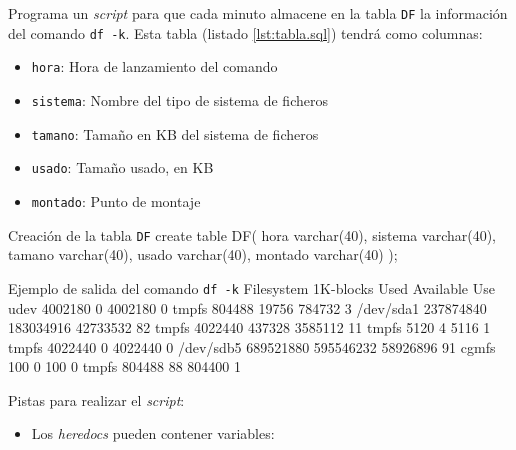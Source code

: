 \begin{homeworkProblem}


  Programa un \textit{script} para que cada minuto almacene en la tabla \texttt{DF} la información del comando \texttt{df -k}. Esta tabla (listado \ref{lst:tabla.sql}) tendrá como columnas:
  \begin{itemize}
  \item \texttt{hora}: Hora de lanzamiento del comando
  \item \texttt{sistema}: Nombre del tipo de sistema de ficheros
  \item \texttt{tamano}: Tamaño en KB del sistema de ficheros
  \item \texttt{usado}: Tamaño usado, en KB
  \item \texttt{montado}: Punto de montaje
  \end{itemize}

  \begin{listadoshell}{Creación de la tabla \texttt{DF}}
  create table DF(
    hora varchar(40),
    sistema varchar(40),
    tamano varchar(40),
    usado varchar(40),
    montado varchar(40)
  );
  \end{listadoshell}



  \begin{listadotxt}[lst:df-k]{Ejemplo de salida del comando \texttt{df -k}}
Filesystem     1K-blocks      Used Available Use%
udev             4002180         0   4002180   0%
tmpfs             804488     19756    784732   3%
/dev/sda1      237874840 183034916  42733532  82%
tmpfs            4022440    437328   3585112  11%
tmpfs               5120         4      5116   1%
tmpfs            4022440         0   4022440   0%
/dev/sdb5      689521880 595546232  58926896  91%
cgmfs                100         0       100   0%
tmpfs             804488        88    804400   1%
  \end{listadotxt}
  

  Pistas para realizar el \textit{script}:
  \begin{itemize}
    
  \item Los \textit{heredocs} pueden contener variables: 
    

\end{itemize}
\end{homeworkProblem}
